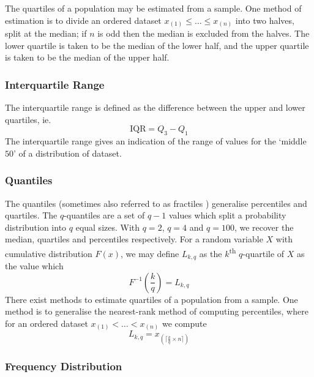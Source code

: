 \documentclass[11pt]{report} %
\begin{document}
The quartiles of a population may be estimated from a sample. One method of estimation is to divide an ordered dataset $x_{\left(1\right)} \leq \dots \leq x_{\left(n\right)}$ into two halves, split at the median; if $n$ is odd then the median is excluded from the halves. The lower quartile is taken to be the median of the lower half, and the upper quartile is taken to be the median of the upper half.

\subsubsection{Interquartile Range}

The interquartile range is defined as the difference between the upper and lower quartiles, ie.
\begin{equation}
\mathrm{IQR} = Q_{3} - Q_{1}
\end{equation}
The interquartile range gives an indication of the range of values for the `middle $50$' of a distribution of dataset.

\subsubsection{Quantiles}

The quantiles (sometimes also referred to as fractiles \cite{Holicky2013}) generalise percentiles and quartiles. The $q$-quantiles are a set of $q - 1$ values which split a probability distribution into $q$ equal sizes. With $q = 2$, $q = 4$ and $q = 100$, we recover the median, quartiles and percentiles respectively. For a random variable $X$ with cumulative distribution $F\left(x\right)$, we may define $L_{k, q}$ as the $k$\textsuperscript{th} $q$-quartile of $X$ as the value which
\begin{equation}
F^{-1}\left(\dfrac{k}{q}\right) = L_{k, q}
\end{equation}
There exist methods to estimate quartiles of a population from a sample. One method is to generalise the nearest-rank method of computing percentiles, where for an ordered dataset $x_{\left(1\right)} < \dots <  x_{\left(n\right)}$ we compute
\begin{equation}
L_{k, q} = x_{\left(\lceil \frac{k}{q} \times n\rceil\right)}
\end{equation}

\subsubsection{Frequency Distribution}
\end{document}
